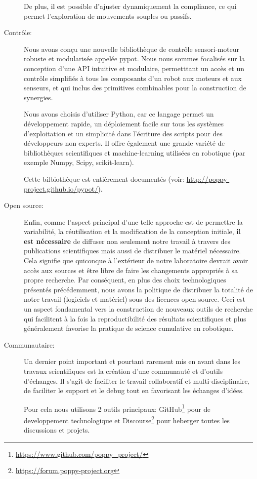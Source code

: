 \begin{description}
  De plus, il est possible d'ajuster dynamiquement la compliance, ce qui permet l'exploration de mouvements souples ou passifs.

  \item[Contrôle:] Nous avons conçu une nouvelle bibliothèque de contrôle sensori-moteur robuste et modularisée appelée pypot. Nous nous sommes focalisés sur la conception d'une API intuitive et modulaire, permetttant un accès et un contrôle simplifiés à tous les composants d'un robot aux moteurs et aux senseurs, et qui inclus des primitives combinables pour la construction de synergies.

  Nous avons choisis d'utiliser Python, car ce langage permet un développement rapide, un déploiement facile sur tous les systèmes d'exploitation et un simplicité dans l'écriture des scripts pour des développeurs non experts. Il offre également une grande variété de bibliothèques scientifiques et machine-learning utilisées en robotique (par exemple Numpy, Scipy, scikit-learn).

  Cette bilbiothèque est entièrement documentés (voir: \url{http://poppy-project.github.io/pypot/}).
  
  \item[Open source:] Enfin, comme l'aspect principal d'une telle approche est de permettre la variabilité, la réutilisation et la modification de la conception initiale, \textbf{il est nécessaire} de diffuser non seulement notre travail à travers des publications scientifiques mais aussi de distribuer le matériel nécessaire. 
  Cela signifie que quiconque à l'extérieur de notre laboratoire devrait avoir accès aux sources et être libre de faire les changements appropriés à sa propre recherche. Par conséquent, en plus des choix technologiques présentés précédemment, nous avons la politique de distribuer la totalité de notre travail (logiciels et matériel) sous des licences open source. Ceci est un aspect fondamental vers la construction de nouveaux outils de recherche qui facilitent à la fois la reproductibilité des résultats scientifiques et plus généralement favorise la pratique de science cumulative en robotique.

  \item[Communautaire:] Un dernier point important et pourtant rarement mis en avant dans les travaux scientifiques est la création d'une communauté et d'outils d'échanges. Il s'agit de faciliter le travail collaboratif et multi-disciplinaire, de faciliter le support et le debug tout en favorisant les échanges d'idées. 

  Pour cela nous utilisons 2 outils principaux: GitHub\footnote{\url{https://www.github.com/poppy_project/}} pour de developpement technologique et Discourse\footnote{\url{https://forum.poppy-project.org}} pour heberger toutes les discussions et projets.

\end{description}


